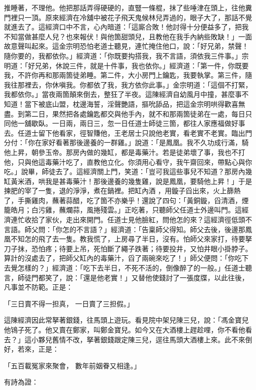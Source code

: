 推睡著，不理他。他把那話弄得硬硬的，直豎一條棍，抹了些唾津在頭上，往他糞門裡只一頂。原來經濟在冷舖中被花子飛天鬼候林兒弄過的，眼子大了，那話不覺就進去了。這經濟口中不言，心內暗道：「這廝合敗！他討得十分便益多了，把我不知當做甚麼人兒？也來報伏！與他箇甜頭兒，且教他在我手內納些敗缺！」一面故意聲叫起來。這金宗明恐怕老道士聽見，連忙掩住他口，說：「好兄弟，禁聲！隨你要的，我都依你。」經濟道：「你既要抅搭我，我不言語，須依我三件事。」宗明道：「好兄弟，休說三件，就是十件事，我也依你。」經濟道：「第一件，你既要我，不許你再和那兩箇徒弟睡。第二件，大小房門上鑰匙，我要執掌。第三件，隨我往那裡去，你休嗔我。你都依了我，我方依你此事。」金宗明道：「這個不打緊，我都依你。」當夜兩箇顛來倒去，整狂了半夜。這陳經濟自幼風月中撞，甚麼事不知道！當下被底山盟，枕邊海誓，淫聲艷語，摳吮舔品，把這金宗明哄得歡喜無盡。到第二日，果然把各處鑰匙都交與他手內，就不和那兩箇徒弟在一處，每日只同他一舖歇臥。一日兩，兩日三，忽一日任道士師徒三箇，都往人家應福做好事去。任道士留下他看家，徑智賺他，王老居士只說他老實，看老實不老實。臨出門分付：「你在家好看著那後邊養的一群雞。」說道：「是鳳凰。我不久功成行滿，騎他上昇，朝參玉帝。那房內做的幾缸，都是毒藥汁。若是徒弟壞了事，我也不打他，只與他這毒藥汁吃了，直教他立化。你須用心看守，我午齋回來，帶點心與你吃。」說畢，師徒去了。這經濟關上門，笑道：「豈可我這些事兒不知道？那房內幾缸黃米酒，哄我是甚毒藥汁！那後邊養的幾隻雞，說是鳳凰，要騎他上昇！」于是揀肥的宰了一隻，退的淨淨，煮在鍋裡。把缸內酒 ，用鏇子舀出來，火上篩熱了，手撕雞肉，蘸著蒜醋，吃了箇不亦樂乎！還說了四句：「黃銅鏇，舀清酒，煙籠皓月；白污雞，蘸爛蒜，風捲殘雲。」正吃著，只聽師父任道士外邊叫門。這經濟連忙收拾了家伙，走出來開門。任道士見他臉紅，問他怎的來？這經濟徑低頭不言語。師父問：「你怎的不言語？」經濟道：「告稟師父得知。師父去後，後邊那鳳凰不知怎的飛了去一隻。教我慌了，上房尋了半日，沒有。怕師父來家打，待要拏刀子抹，恐怕疼；待要上吊，死怕斷了繩子跌著；待要投井，又怕井眼小掛脖子。算計的沒處去了，把師父缸內的毒藥汁，舀了兩碗來吃了！」師父便問：「你吃下去覺怎樣的？」經濟道：「吃下去半日，不死不活的，倒像醉了的一般。」任道士聽言，師徒門都笑了，說：「還是他老實！」又替他使錢討了一張度牒，以此往後，凡事並不防範。正是：

「三日賣不得一担真，  一日賣了三担假。」

這陳經濟因此常拏著銀錢，往馬頭上遊玩。看見院中架兒陳三兒，說：「馮金寶兒他鴇子死了。他又賣在鄭家，叫鄭金寶兒。如今又在大酒樓上趕趁哩，你不看他看去？」這小夥兒舊情不改，拏著銀錢跟定陳三兒，逕往馬頭大酒樓上來。此不來倒好，若來，正是：

「五百載冤家來聚會，  數年前姻眷又相逢。」

有詩為證：

